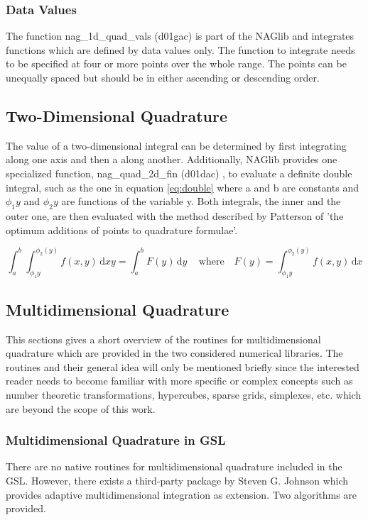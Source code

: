 \subsubsection{Data Values}
The function nag\_1d\_quad\_vals (d01gac)\cite{nag_d01gac} is part of the NAGlib and integrates functions which are defined by data values only. The function to integrate needs to be specified at four or more points over the whole range. The points can be unequally spaced but should be in either ascending or descending order. 




\subsection{Two-Dimensional Quadrature}
The value of a two-dimensional integral can be determined by first integrating along one axis and then a along another. Additionally, NAGlib provides one specialized function, nag\_quad\_2d\_fin (d01dac) \cite{nag_d01ac}, to evaluate a definite double integral, such as the one in equation \ref{eq:double} where a and b are constants and $\phi_1{y}$ and $\phi_2{y}$ are functions of the variable y. Both integrals, the inner and the outer one, are then evaluated with the method described by Patterson \cite{Patterson1967} of 'the optimum additions of points to quadrature formulae'.

\begin{equation}
	\int_a^b \int_{\phi_1{y}}^{\phi_2(y)} f(x,y)  \, \mathrm{d}xy = \int_a^b F(y) \, \mathrm{d}y \, \quad
	\text{where} \quad F(y) = \int_{\phi_1{y}}^{\phi_2(y)} f(x,y)\, \mathrm{d}x
\label{eq:double}
\end{equation}



\subsection{Multidimensional Quadrature}
This sections gives a short overview of the routines for multidimensional quadrature which are provided in the two considered numerical libraries. The routines and their general idea will only be mentioned briefly since the interested reader needs to become familiar with more specific or complex concepts such as number theoretic transformations, hypercubes, sparse grids, simplexes, etc. which are beyond the scope of this work.


\subsubsection{Multidimensional Quadrature in GSL}
There are no native routines for multidimensional quadrature included in the GSL. However, there exists a third-party package by Steven G. Johnson which provides adaptive multidimensional integration as extension. Two algorithms are provided.

